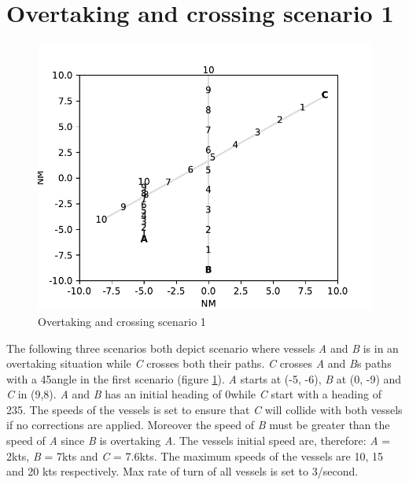 \section{Overtaking and crossing scenario 1}%
\label{sec:overtaking-and-crossing}
\begin{figure}[h]
    \centering
    \includegraphics[width=\textwidth,height=0.75\textheight,keepaspectratio]{Figures/Scenario/overtaking-and-crossing.pdf}
    \caption{Overtaking and crossing scenario 1 \cite{ecolreg_overtaking-and-crossing}}
    \label{fig:overtaking-and-crossing}
\end{figure}
The following three scenarios both depict scenario where vessels \textit{A} and \textit{B} is in an overtaking situation while \textit{C} crosses both their paths. \textit{C} crosses \textit{A} and \textit{B}s paths with a 45\textdegree  angle in the first scenario (figure \ref{fig:overtaking-and-crossing}). \textit{A} starts at (-5, -6), \textit{B} at (0, -9) and \textit{C} in (9,8). \textit{A} and \textit{B} has an initial heading of 0\textdegree  while \textit{C} start with a heading of 235\textdegree. The speeds of the vessels is set to ensure that \textit{C} will collide with both vessels if no corrections are applied. Moreover the speed of \textit{B} must be greater than the speed of \textit{A} since \textit{B} is overtaking \textit{A}. The vessels initial speed are, therefore: \textit{A} = 2kts, \textit{B} = 7kts and \textit{C} = 7.6kts. The maximum speeds of the vessels are 10, 15 and 20 kts respectively. Max rate of turn of all vessels is set to 3\textdegree/second.

